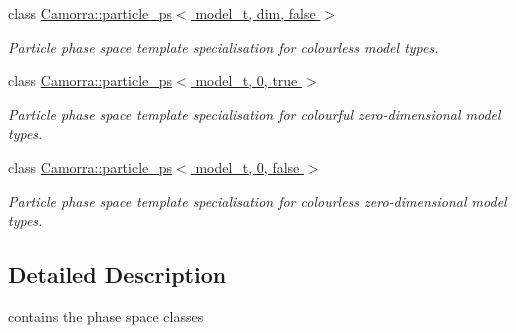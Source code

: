\begin{DoxyCompactItemize}
class \hyperlink{a00398}{Camorra::particle\_\-ps$<$ model\_\-t, dim, false $>$}
\begin{DoxyCompactList}\small\item\em Particle phase space template specialisation for colourless model types. \end{DoxyCompactList}\item 
class \hyperlink{a00397}{Camorra::particle\_\-ps$<$ model\_\-t, 0, true $>$}
\begin{DoxyCompactList}\small\item\em Particle phase space template specialisation for colourful zero-\/dimensional model types. \end{DoxyCompactList}\item 
class \hyperlink{a00396}{Camorra::particle\_\-ps$<$ model\_\-t, 0, false $>$}
\begin{DoxyCompactList}\small\item\em Particle phase space template specialisation for colourless zero-\/dimensional model types. \end{DoxyCompactList}\end{DoxyCompactItemize}


\subsection{Detailed Description}
contains the phase space classes 